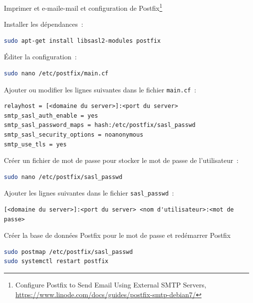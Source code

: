 \documentclass{beamer}
\begin{document}
    \begin{frame}[fragile]{Imprimer et e-mail}{e-mail et configuration de Postfix\footnote{Configure Postfix to Send Email Using External SMTP Servers, \url{https://www.linode.com/docs/guides/postfix-smtp-debian7/}}}
        \begin{tiny}
            Installer les dépendances~:
            \begin{lstlisting}[language=bash,basicstyle=\tiny\ttfamily]
sudo apt-get install libsasl2-modules postfix
            \end{lstlisting}
            Éditer la configuration~:
            \begin{lstlisting}[language=bash,basicstyle=\tiny\ttfamily]
sudo nano /etc/postfix/main.cf
            \end{lstlisting}
            Ajouter ou modifier les lignes suivantes dans le fichier \lstinline{main.cf}~:
            \begin{lstlisting}[basicstyle=\tiny\ttfamily]
relayhost = [<domaine du server>]:<port du server>
smtp_sasl_auth_enable = yes
smtp_sasl_password_maps = hash:/etc/postfix/sasl_passwd
smtp_sasl_security_options = noanonymous
smtp_use_tls = yes
            \end{lstlisting}
            Créer un fichier de mot de passe pour stocker le mot de passe de l'utilisateur~:
            \begin{lstlisting}[language=bash,basicstyle=\tiny\ttfamily]
sudo nano /etc/postfix/sasl_passwd
            \end{lstlisting}
            Ajouter les lignes suivantes dans le fichier \lstinline{sasl_passwd}~:
            \begin{lstlisting}[basicstyle=\tiny\ttfamily]
[<domaine du server>]:<port du server> <nom d'utilisateur>:<mot de passe>
            \end{lstlisting}
            Créer la base de données Postfix pour le mot de passe et redémarrer Postfix
            \begin{lstlisting}[language=bash,basicstyle=\tiny\ttfamily]
sudo postmap /etc/postfix/sasl_passwd
sudo systemctl restart postfix
            \end{lstlisting}
        \end{tiny}
    \end{frame}
\end{document}
